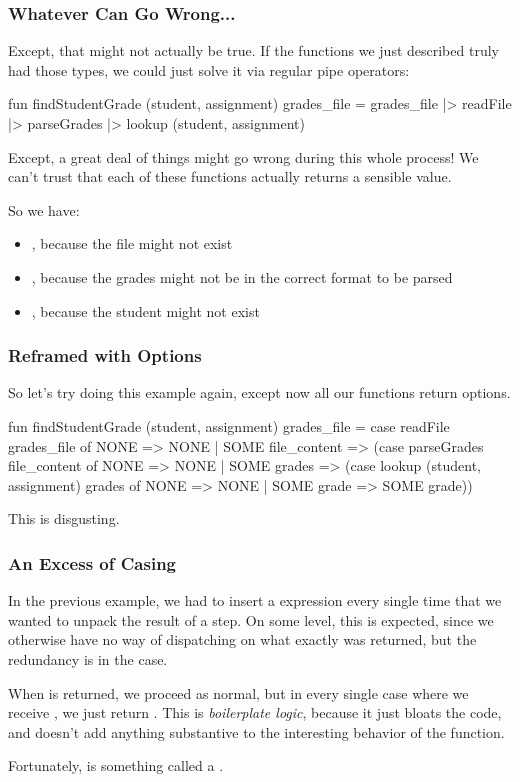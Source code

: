 \documentclass[aspectratio=169]{beamer}
\begin{document}
\begin{frame}[fragile]
  \frametitle{Whatever Can Go Wrong...}

  Except, that might not actually be true. If the functions we just described truly had
  those types, we could just solve it via regular pipe operators:

  \begin{codeblock}
    fun findStudentGrade (student, assignment) grades_file =
      grades_file
      |> readFile
      |> parseGrades 
      |> lookup (student, assignment)
  \end{codeblock}

  Except, a great deal of things might go wrong during this whole process! We can't
  trust that each of these functions actually returns a sensible value.

  So we have:
  \begin{itemize} 
    \item {}, because the file might not exist 
    \item {}, because the grades might not be in the
    correct format to be parsed 
    \item {}, because the student might not exist 
  \end{itemize}
\end{frame}

\begin{frame}[fragile]
  \frametitle{Reframed with Options}

  So let's try doing this example again, except now all our functions return options.

  \begin{codeblock}
    fun findStudentGrade (student, assignment) grades_file =
      case readFile grades_file of
        NONE => NONE
      | SOME file_content => 
        (case parseGrades file_content of 
          NONE => NONE
        | SOME grades =>
          (case lookup (student, assignment) grades of 
            NONE => NONE 
          | SOME grade => SOME grade))
  \end{codeblock}

  This is disgusting.
\end{frame}

\begin{frame}[fragile]
  \frametitle{An Excess of Casing}

  In the previous example, we had to insert a  expression every single 
  time that we wanted to unpack the result of a step. On some level, this is expected,
  since we otherwise have no way of dispatching on what exactly was returned, but the
  redundancy is in the  case.

  When  is returned, we proceed as normal, but in every single case where we
  receive , we just return . This is \textit{boilerplate logic},
  because it just bloats the code, and doesn't add anything substantive to the interesting
  behavior of the function.

  Fortunately,  is something called a .
\end{frame}
\end{document}
